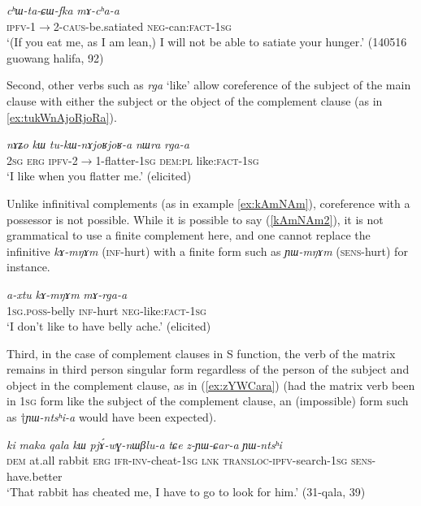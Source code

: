 \documentclass[oneside,a4paper,11pt]{article}
\newcommand{\ipa}[1]{\textit{\phon#1}}
\newcommand{\jpg}[2]{\ipa{#1} `#2'}
\newcommand{\refb}[1]{(\ref{#1})}
\begin{document}
\begin{exe}
\ex \label{ex:machaa}
\gll
\ipa{cʰɯ-ta-ɕɯ-fka} 	\ipa{mɤ-cʰa-a} \\
\textsc{ipfv-1$\rightarrow$2-caus}-be.satiated \textsc{neg}-can:\textsc{fact-1sg} \\
\glt `(If you eat me, as I am lean,) I will not be able to satiate your hunger.' (140516 guowang halifa, 92)
\end{exe}

Second, other verbs such as \jpg{rga}{like} allow coreference of the subject of the main clause with either the subject or the object of the complement clause (as in \ref{ex:tukWnAjoRjoRa}).

\begin{exe}
\ex \label{ex:tukWnAjoRjoRa}
\gll \ipa{nɤʑo} \ipa{kɯ} \ipa{tu-kɯ-nɤjoʁjoʁ-a} \ipa{nɯra}	\ipa{rga-a} \\
\textsc{2sg} \textsc{erg} \textsc{ipfv}-2$\rightarrow$1-flatter-\textsc{1sg} \textsc{dem:pl} like:\textsc{fact-1sg} \\
\glt `I like when you flatter me.' (elicited)
\end{exe}

Unlike infinitival complements (as in example \ref{ex:kAmNAm}), coreference with a possessor is not possible. While it is possible to say (\ref{kAmNAm2}), it is not grammatical to use a finite complement here, and one cannot replace the infinitive \ipa{kɤ-mŋɤm} (\textsc{inf}-hurt) with a finite form such as \ipa{ɲɯ-mŋɤm} (\textsc{sens}-hurt) for instance.

\begin{exe}
\ex \label{kAmNAm2}
\gll \ipa{a-xtu} \ipa{kɤ-mŋɤm} \ipa{mɤ-rga-a} \\
\textsc{1sg.poss}-belly \textsc{inf}-hurt \textsc{neg}-like:\textsc{fact-1sg} \\
\glt `I don't like to have belly ache.' (elicited)
\end{exe}

Third, in the case of complement clauses in S function, the verb of the matrix remains in third person singular form regardless of the person of the subject and object in the complement clause, as in \refb{ex:zYWCara} (had the matrix verb been in \textsc{1sg} form like the subject of the complement clause, an (impossible) form such as $\dagger$\ipa{ɲɯ-ntsʰi-a} would have been expected).

\begin{exe}
\ex \label{ex:zYWCara}
\gll \ipa{ki} 	\ipa{maka} 	\ipa{qala} 	\ipa{kɯ} 	\ipa{pjɤ́-wɣ-nɯβlu-a} 	\ipa{tɕe} 	\ipa{z-ɲɯ-ɕar-a} 	\ipa{ɲɯ-ntsʰi}\\ 
\textsc{dem} at.all rabbit \textsc{erg} \textsc{ifr-inv}-cheat-\textsc{1sg} \textsc{lnk} \textsc{transloc-ipfv}-search-\textsc{1sg} \textsc{sens}-have.better \\
\glt `That rabbit has cheated me, I have to go to look for him.' (31-qala, 39)
\end{exe}
\end{document}
